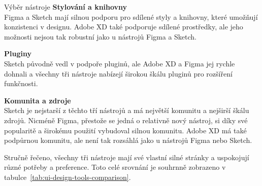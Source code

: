 \begin{subsection}{Výběr nástroje}
    \textbf{Stylování a knihovny}\\
    Figma a Sketch mají silnou podporu pro sdílené styly a knihovny, které umožňují konzistenci v designu.
    Adobe XD také podporuje sdílené prostředky, ale jeho možnosti nejsou tak robustní jako u nástrojů Figma a Sketch.

    \textbf{Pluginy}\\
    Sketch původně vedl v podpoře pluginů, ale Adobe XD a Figma jej rychle dohnali a všechny tři nástroje nabízejí širokou škálu pluginů pro rozšíření funkčnosti.

    \textbf{Komunita a zdroje}\\
    Sketch je nejstarší z těchto tří nástrojů a má největší komunitu a nejširší škálu zdrojů.
    Nicméně Figma, přestože se jedná o relativně nový nástroj, si díky své popularitě a širokému použití vybudoval silnou komunitu.
    Adobe XD má také podpůrnou komunitu, ale není tak rozsáhlá jako u nástrojů Figma nebo Sketch.

    Stručně řečeno, všechny tři nástroje mají své vlastní silné stránky a uspokojují různé potřeby a preference.
    Toto celé srovnání je souhrnně zobrazeno v tabulce~\ref{tab:ui-design-tools-comparison}.


\end{subsection}
